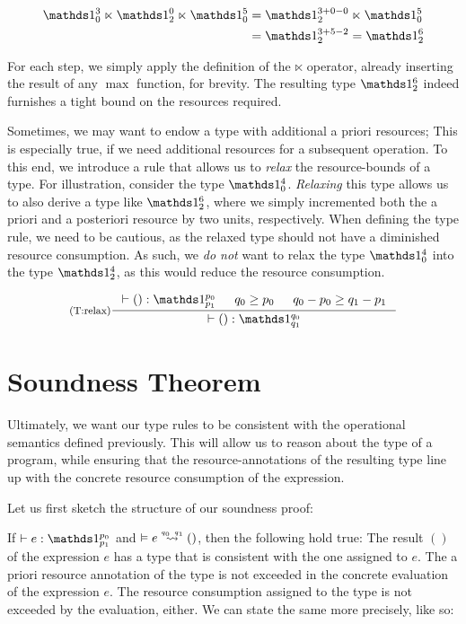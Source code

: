 \begin{align*}
   \ratype{\unit}{3}{0} \ltimes \unit^{0}_{2} \ltimes \unit^{5}_{0} &= \unit^{3 + 0 - 0}_2 \ltimes \unit^5_0\\
                                                             &= \unit^{3 + 5 - 2}_2 = \unit^6_2
\end{align*}

For each step, we simply apply the definition of the \(\ltimes\) operator, already inserting the result of any \(\max\) function, for brevity. The resulting type \(\unit^6_2\) indeed furnishes a tight bound on the resources required. 

Sometimes, we may want to endow a type with additional a priori resources; This is especially true, if we need additional resources for a subsequent operation. To this end, we introduce a rule that allows us to \emph{relax} the resource-bounds of a type. For illustration, consider the type \(\unit^4_0\). \emph{Relaxing} this type allows us to also derive a type like \(\unit^6_2\), where we simply incremented both the a priori and a posteriori resource by two units, respectively. When defining the type rule, we need to be cautious, as the relaxed type should not have a diminished resource consumption. As such, we \emph{do not} want to relax the type \(\unit^4_0\) into the type \(\unit^4_2\), as this would reduce the resource consumption.

\[
   \inference[(T:relax)]
   {\vdash () : \ratype{\unit}{p_0}{p_1}
      & 
   q_0 \geq p_0
      &
   q_0 - p_0 \geq q_1 - p_1}
   {\vdash () : \ratype{\unit}{q_0}{q_1}}
\]


\section{Soundness Theorem}
Ultimately, we want our type rules to be consistent with the operational semantics defined previously. This will allow us to reason about the type of a program, while ensuring that the resource-annotations of the resulting type line up with the concrete resource consumption of the expression.

Let us first sketch the structure of our soundness proof:

If \(\typing{}{e}{\ratype{\unit}{p_0}{p_1}}\) and \(\evals{}{e}{()}{q_0}{q_1}\), then the following hold true:
The result \(()\) of the expression \(e\) has a type that is consistent with the one assigned to \(e\). The a priori resource annotation of the type is not exceeded in the concrete evaluation of the expression \(e\). The resource consumption assigned to the type is not exceeded by the evaluation, either. We can state the same more precisely, like so: 


